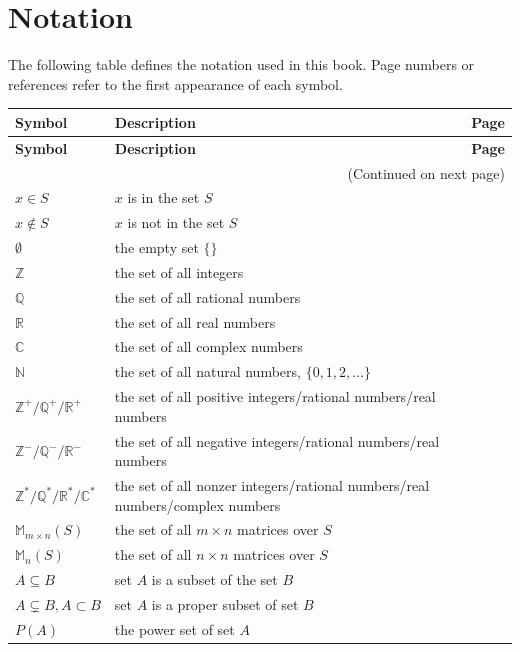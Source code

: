 \documentclass[10pt,]{book}
\theoremstyle{plain}
\theoremstyle{definition}
\theoremstyle{definition}
\theoremstyle{definition}
\theoremstyle{definition}
\numberwithin{equation}{section}
\def\Z{\mathbb{Z}}
\def\R{\mathbb{R}}
\def\Q{\mathbb{Q}}
\def\C{\mathbb{C}}
\def\N{\mathbb{N}}
\def\M{\mathbb{M}}
\begin{document}
\chapter[{Notation}]{Notation}\label{appendix-1}
The following table defines the notation used in this book. Page numbers or references refer to the first appearance of each symbol.%
\begin{longtable}[l]{lp{}r}
\textbf{Symbol}&\textbf{Description}&\textbf{Page}\\[1em]
\endfirsthead
\textbf{Symbol}&\textbf{Description}&\textbf{Page}\\[1em]
\endhead
\multicolumn{3}{r}{(Continued on next page)}\\
\endfoot
\endlastfoot
\(x \in S\)&\(x\) is in the set \(S\)&\pageref{notation-1}\\
\(x \not\in S\)&\(x\) is not in the set \(S\)&\pageref{notation-2}\\
\(\emptyset\)&the empty set \(\{\}\)&\pageref{notation-3}\\
\(\Z\)&the set of all integers&\pageref{notation-4}\\
\(\Q\)&the set of all rational numbers&\pageref{notation-5}\\
\(\R\)&the set of all real numbers&\pageref{notation-6}\\
\(\C\)&the set of all complex numbers&\pageref{notation-7}\\
\(\N\)&the set of all natural numbers, \(\{0,1,2,\ldots\}\)&\pageref{notation-8}\\
\(\Z^+/\Q^+/\R^+\)&the set of all positive integers/rational numbers/real numbers&\pageref{notation-9}\\
\(\Z^-/\Q^-/\R^-\)&the set of all negative integers/rational numbers/real numbers&\pageref{notation-10}\\
\(\Z^*/\Q^*/\R^*/\C^*\)&the set of all nonzer integers/rational numbers/real numbers/complex numbers&\pageref{notation-11}\\
\(\M_{m\times n}(S)\)&the set of all \(m \times n\) matrices over \(S\)&\pageref{notation-12}\\
\(\M_n(S)\)&the set of all \(n \times n\) matrices over \(S\)&\pageref{notation-13}\\
\(A\subseteq B\)&set \(A\) is a subset of the set \(B\)&\pageref{notation-14}\\
\(A\subsetneq B, A \subset B\)&set \(A\) is a proper subset of set \(B\)&\pageref{notation-15}\\
\(P(A)\)&the power set of set \(A\)&\pageref{notation-16}\\

\end{longtable}
\end{document}
